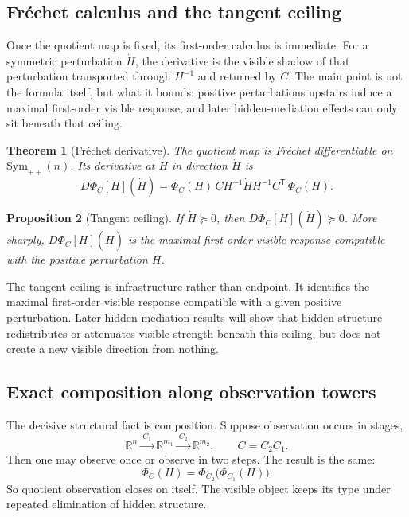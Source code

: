 \documentclass[11pt]{article}
\numberwithin{equation}{section}
\newcommand{\Sym}{\mathrm{Sym}}
\theoremstyle{thmcompact}
\newtheorem{theorem}{Theorem}[section]
\newtheorem{proposition}[theorem]{Proposition}
\theoremstyle{remark}
\begin{document}
\subsection{Fr\'echet calculus and the tangent ceiling}

Once the quotient map is fixed, its first-order calculus is immediate. For a symmetric perturbation $\dot H$, the derivative is the visible shadow of that perturbation transported through $H^{-1}$ and returned by $C$. The main point is not the formula itself, but what it bounds: positive perturbations upstairs induce a maximal first-order visible response, and later hidden-mediation effects can only sit beneath that ceiling.

\begin{theorem}[Fr\'echet derivative]
\label{thm:frechet-derivative}
The quotient map is Fr\'echet differentiable on $\Sym_{++}(n)$. Its derivative at $H$ in direction $\dot H$ is
\begin{equation}
D\Phi_C[H](\dot H)
=
\Phi_C(H)\, C H^{-1} \dot H H^{-1} C^{\mathsf T}\, \Phi_C(H).
\label{eq:derivative-schur}
\end{equation}
\end{theorem}

\begin{proposition}[Tangent ceiling]
If $\dot H \succeq 0$, then $D\Phi_C[H](\dot H) \succeq 0$. More sharply, $D\Phi_C[H](\dot H)$ is the maximal first-order visible response compatible with the positive perturbation $\dot H$.
\end{proposition}

The tangent ceiling is infrastructure rather than endpoint. It identifies the maximal first-order visible response compatible with a given positive perturbation. Later hidden-mediation results will show that hidden structure redistributes or attenuates visible strength beneath this ceiling, but does not create a new visible direction from nothing.

\subsection{Exact composition along observation towers}

The decisive structural fact is composition. Suppose observation occurs in stages,
\begin{equation}
\mathbb{R}^n \xrightarrow{\ C_1\ } \mathbb{R}^{m_1} \xrightarrow{\ C_2\ } \mathbb{R}^{m_2},
\qquad
C = C_2 C_1.
\end{equation}
Then one may observe once or observe in two steps. The result is the same:
\begin{equation}
\Phi_C(H)
=
\Phi_{C_2}\!\bigl(\Phi_{C_1}(H)\bigr).
\label{eq:tower-composition}
\end{equation}
So quotient observation closes on itself. The visible object keeps its type under repeated elimination of hidden structure.
\end{document}
